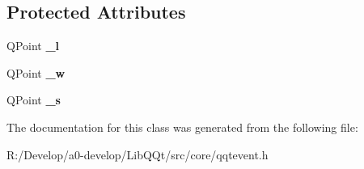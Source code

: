 \subsection*{Protected Attributes}
\begin{DoxyCompactItemize}
\item 
\mbox{\label{class_q_qt_mouse_event_aa90d33443cbe4695d2f26f8c64c1f0c2}} 
Q\+Point {\bfseries \+\_\+l}
\item 
\mbox{\label{class_q_qt_mouse_event_a77aaa71e71ff09ad78503476a26aa974}} 
Q\+Point {\bfseries \+\_\+w}
\item 
\mbox{\label{class_q_qt_mouse_event_a35dbd70a0f17be7e521e7a8c7c819546}} 
Q\+Point {\bfseries \+\_\+s}
\end{DoxyCompactItemize}


The documentation for this class was generated from the following file\+:\begin{DoxyCompactItemize}
\item 
R\+:/\+Develop/a0-\/develop/\+Lib\+Q\+Qt/src/core/qqtevent.\+h\end{DoxyCompactItemize}
